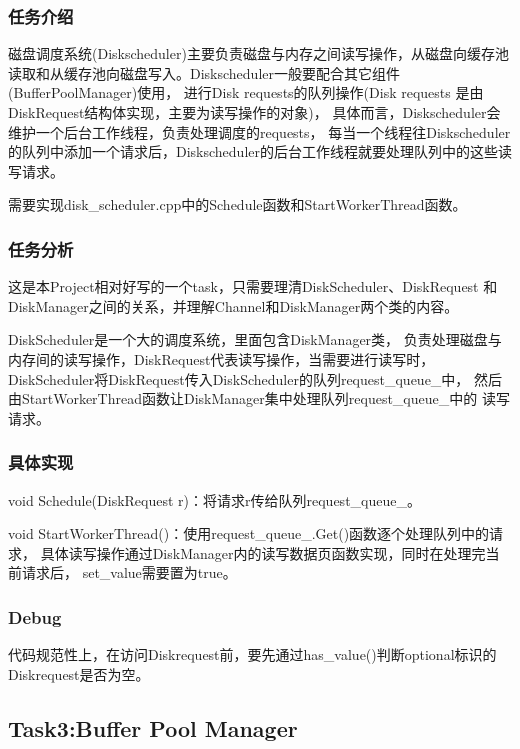 \documentclass[a4paper]{article}
\begin{document}
\subsubsection{任务介绍}

磁盘调度系统(Diskscheduler)主要负责磁盘与内存之间读写操作，从磁盘向缓存池
读取和从缓存池向磁盘写入。Diskscheduler一般要配合其它组件(BufferPoolManager)使用，
进行Disk requests的队列操作(Disk requests 是由DiskRequest结构体实现，主要为读写操作的对象)，
具体而言，Diskscheduler会维护一个后台工作线程，负责处理调度的requests，
每当一个线程往Diskscheduler的队列中添加一个请求后，Diskscheduler的后台工作线程就要处理队列中的这些读写请求。

需要实现disk\_scheduler.cpp中的Schedule函数和StartWorkerThread函数。

\subsubsection{任务分析}

这是本Project相对好写的一个task，只需要理清DiskScheduler、DiskRequest
和DiskManager之间的关系，并理解Channel和DiskManager两个类的内容。

DiskScheduler是一个大的调度系统，里面包含DiskManager类，
负责处理磁盘与内存间的读写操作，DiskRequest代表读写操作，当需要进行读写时，
DiskScheduler将DiskRequest传入DiskScheduler的队列request\_queue\_中，
然后由StartWorkerThread函数让DiskManager集中处理队列request\_queue\_中的
读写请求。

\subsubsection{具体实现}

void Schedule(DiskRequest r)：将请求r传给队列request\_queue\_。

void StartWorkerThread()：使用request\_queue\_.Get()函数逐个处理队列中的请求，
具体读写操作通过DiskManager内的读写数据页函数实现，同时在处理完当前请求后，
set\_value需要置为true。

\subsubsection{Debug}

代码规范性上，在访问Diskrequest前，要先通过has\_value()判断optional标识的
Diskrequest是否为空。

\subsection{Task3:Buffer Pool Manager}
\end{document}
